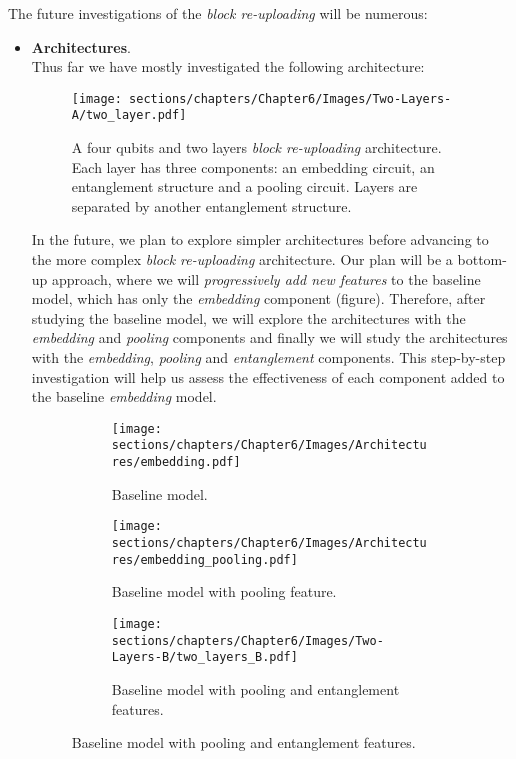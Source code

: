 
The future investigations of the \textit{block re-uploading} will be numerous:

\begin{itemize}
    \item \textbf{Architectures}.\\
    Thus far we have mostly investigated the following architecture:

    \begin{figure}[h]
        \centering
        \texttt{[image: sections/chapters/Chapter6/Images/Two-Layers-A/two\_layer.pdf]}
        \caption{A four qubits and two layers \textit{block re-uploading} architecture. Each layer has three 
        components: an embedding circuit, an entanglement structure and a pooling circuit.
        Layers are separated by another entanglement structure.}
    \end{figure}

    In the future, we plan to explore simpler architectures before advancing to the more 
    complex \textit{block re-uploading} architecture. 
    Our plan will be a bottom-up approach, where we will \textit{progressively add new features} to the baseline model, 
    which has only the \textit{embedding} component (figure).
    Therefore, after studying the baseline model, we will explore the architectures with the 
    \textit{embedding} and \textit{pooling} components and finally we will study the architectures 
    with the \textit{embedding}, \textit{pooling} and \textit{entanglement} components.
    This step-by-step investigation will 
    help us assess the effectiveness of each component added to the baseline \textit{embedding} model.

    \begin{figure}[h]
        \centering
        \begin{subfigure}[b]{\textwidth}
            \centering
            \texttt{[image: sections/chapters/Chapter6/Images/Architectures/embedding.pdf]}
        \caption*{Baseline model.}
        \end{subfigure}
        \begin{subfigure}[b]{\textwidth}
            \centering
            \texttt{[image: sections/chapters/Chapter6/Images/Architectures/embedding\_pooling.pdf]}
        \caption*{Baseline model with pooling feature.}
        \end{subfigure}
        \begin{subfigure}[b]{\textwidth}
            \centering
            \texttt{[image: sections/chapters/Chapter6/Images/Two-Layers-B/two\_layers\_B.pdf]}
        \caption*{Baseline model with pooling and entanglement features.}
        \end{subfigure}
    \end{figure}


\end{itemize}
